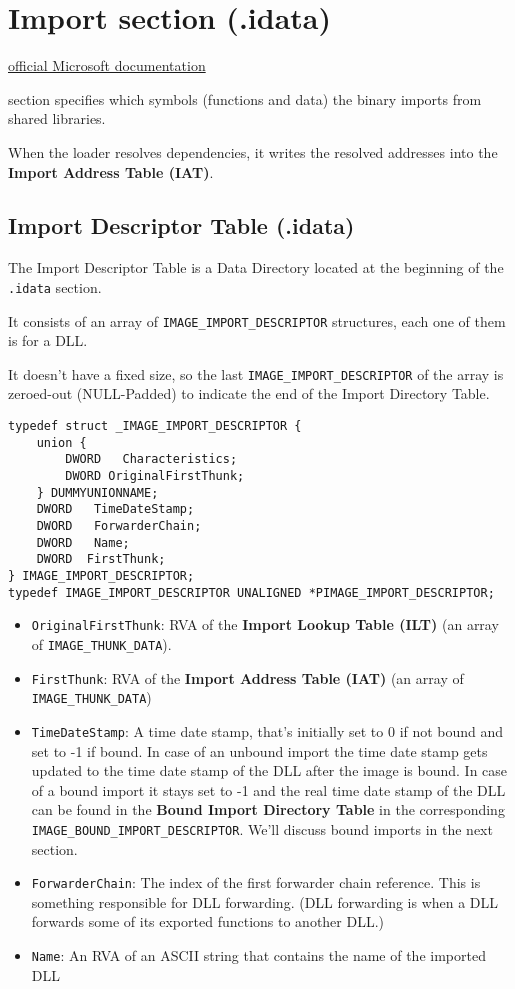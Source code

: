 \section{Import section (.idata)}
\href{https://learn.microsoft.com/en-us/windows/win32/debug/pe-format#import-directory-table}{official Microsoft documentation}

section specifies which symbols (functions and data) the binary imports from shared libraries.

When the loader resolves dependencies, it writes the resolved addresses into the {\bf Import Address Table (IAT)}.


\subsection{Import Descriptor Table (.idata)}
The Import Descriptor Table is a Data Directory located at the beginning of the \verb+.idata+ section.

It consists of an array of \verb+IMAGE_IMPORT_DESCRIPTOR+ structures, each one of them is for a DLL.

It doesn’t have a fixed size, so the last \verb+IMAGE_IMPORT_DESCRIPTOR+ of the array is zeroed-out (NULL-Padded) to indicate the end of the Import Directory Table.

\begin{verbatim}
typedef struct _IMAGE_IMPORT_DESCRIPTOR {
    union {
        DWORD   Characteristics;
        DWORD OriginalFirstThunk;
    } DUMMYUNIONNAME;
    DWORD   TimeDateStamp;
    DWORD   ForwarderChain;
    DWORD   Name;
    DWORD  FirstThunk;
} IMAGE_IMPORT_DESCRIPTOR;
typedef IMAGE_IMPORT_DESCRIPTOR UNALIGNED *PIMAGE_IMPORT_DESCRIPTOR;    
\end{verbatim}


\begin{itemize}
    \item \verb+OriginalFirstThunk+: RVA of the {\bf Import Lookup Table (ILT)} (an array of \verb+IMAGE_THUNK_DATA+).
    \item \verb+FirstThunk+: RVA of the {\bf Import Address Table (IAT)} (an array of \verb+IMAGE_THUNK_DATA+)
    \item \verb+TimeDateStamp+: A time date stamp, that’s initially set to 0 if not bound and set to -1 if bound. In case of an unbound import the time date stamp gets updated to the time date stamp of the DLL after the image is bound. In case of a bound import it stays set to -1 and the real time date stamp of the DLL can be found in the {\bf Bound Import Directory Table} in the corresponding \verb+IMAGE_BOUND_IMPORT_DESCRIPTOR+.
    We’ll discuss bound imports in the next section.
    \item \verb+ForwarderChain+: The index of the first forwarder chain reference. This is something responsible for DLL forwarding. (DLL forwarding is when a DLL forwards some of its exported functions to another DLL.)
    \item \verb+Name+: An RVA of an ASCII string that contains the name of the imported DLL
\end{itemize}


